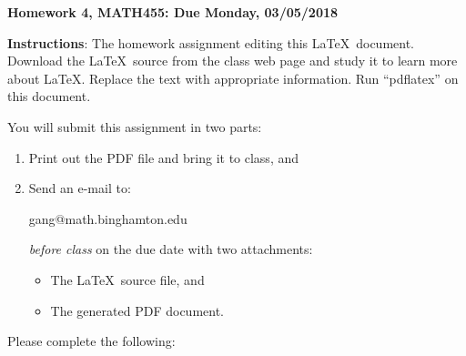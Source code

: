 \documentclass[12pt]{article}
\begin{document}
	
	\begin{title}
		{\Large\bf Homework 4, MATH455: Due Monday, 03/05/2018}
	\end{title}
	
	\author{\bf Your Name: (replace this)}
	
	\maketitle
	{\bf Instructions}:  The homework assignment editing this \LaTeX\ document.  Download the \LaTeX\ source from the class web page and study
	it to learn more about \LaTeX.  Replace the text with appropriate information.  Run ``pdflatex'' on this document.
	
	You will submit this assignment in two parts:
	\begin{enumerate}
		\item Print out the PDF file and bring it to class, and
		\item Send an e-mail to:
		\begin{center}
			gang@math.binghamton.edu
		\end{center}
		\emph{before class} on the due date with two attachments:
		\begin{itemize}
			\item The \LaTeX\ source file, and
			\item The generated PDF document.
		\end{itemize}
	\end{enumerate}
	\newpage
	Please complete the following:
\end{document}
